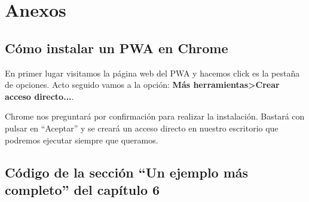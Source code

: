 \chapter{Anexos}\label{anexos}

\section{Cómo instalar un PWA en Chrome}

En primer lugar visitamos la página web del PWA y hacemos click es la pestaña de opciones. Acto seguido vamos a la opción: \textbf{Más herramientas\textgreater Crear acceso directo...}.


Chrome nos preguntará por confirmación para realizar la instalación. Bastará con pulsar en ``Aceptar'' y se creará un acceso directo en nuestro escritorio que podremos ejecutar siempre que queramos.
\pagebreak
\section{Código de la sección ``Un ejemplo más completo'' del capítulo 6}



